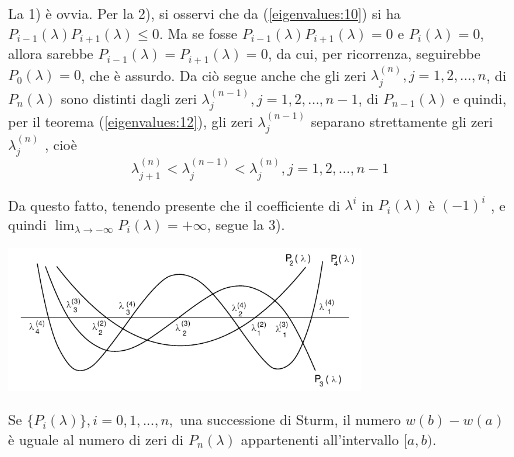\begin{thproof}
 La 1) \`e ovvia. Per la 2), si osservi che da
(\ref{eigenvalues:10}) si ha $P_{i−1} (\lambda)P_{i+1}(\lambda) \leq 0$.
Ma se fosse $P_{i−1} (\lambda)P_{i+1} (\lambda) = 0 $ e $P_i (\lambda)
= 0$, allora sarebbe $P_{i−1} (\lambda) = P_{i+1} (\lambda) = 0$, da
cui, per ricorrenza, seguirebbe $P_0 (\lambda) = 0$, che \`e assurdo.
Da ci\`o segue anche che gli zeri $\lambda_j^{(n)} , j = 1, 2, \ldots , n$,
 di $P_n (\lambda)$ sono distinti dagli zeri
$\lambda_j^{(n-1)}, j = 1, 2, \ldots , n - 1$, di $P_{n−1} (\lambda)$ e quindi,
 per il teorema (\ref{eigenvalues:12}), gli zeri $\lambda_j^{(n-1)}$ separano
strettamente gli zeri $\lambda_j^{(n)}$ , cio\`e
$$
\lambda_{j+1}^{(n)} < \lambda_{j}^{(n-1)} < \lambda_{j}^{(n)},
j=1,2,\ldots,n-1
$$

Da questo fatto, tenendo presente che il coefficiente di
$\lambda^i$ in $P_i(\lambda)$ \`e $(−1)^i$ ,
e quindi $\displaystyle \lim_{\lambda \to - \infty}P_i(\lambda) = +\infty$,
segue la 3).
\begin{center}
\includegraphics[width=0.7\textwidth]{imgs/grafico01.png}
\end{center}
\end{thproof}

\begin{theo}[Sturm]
Se $\{P_i (\lambda)\}, i = 0, 1, . . . , n,$  una successione di Sturm,
il numero $w(b) − w(a)$ \`e uguale al numero di zeri di $P_n (\lambda)$
 appartenenti all’intervallo $[a, b)$.
\end{theo}

